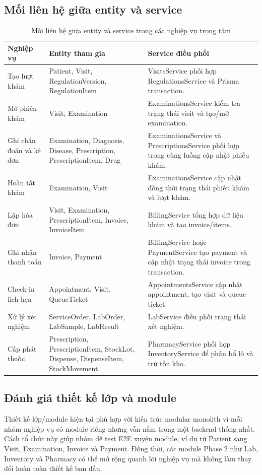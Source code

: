\subsection{Mối liên hệ giữa entity và service}

\begin{longtable}{|p{4cm}|p{5cm}|p{5.5cm}|}
\caption{Mối liên hệ giữa entity và service trong các nghiệp vụ trọng tâm}\\
\hline
\textbf{Nghiệp vụ} & \textbf{Entity tham gia} & \textbf{Service điều phối} \\
\hline
Tạo lượt khám & Patient, Visit, RegulationVersion, RegulationItem & VisitsService phối hợp RegulationsService và Prisma transaction. \\
\hline
Mở phiên khám & Visit, Examination & ExaminationsService kiểm tra trạng thái visit và tạo/mở examination. \\
\hline
Ghi chẩn đoán và kê đơn & Examination, Diagnosis, Disease, Prescription, PrescriptionItem, Drug & ExaminationsService và PrescriptionsService phối hợp trong cùng luồng cập nhật phiếu khám. \\
\hline
Hoàn tất khám & Examination, Visit & ExaminationsService cập nhật đồng thời trạng thái phiếu khám và lượt khám. \\
\hline
Lập hóa đơn & Visit, Examination, PrescriptionItem, Invoice, InvoiceItem & BillingService tổng hợp dữ liệu khám và tạo invoice/items. \\
\hline
Ghi nhận thanh toán & Invoice, Payment & BillingService hoặc PaymentService tạo payment và cập nhật trạng thái invoice trong transaction. \\
\hline
Check-in lịch hẹn & Appointment, Visit, QueueTicket & AppointmentsService cập nhật appointment, tạo visit và queue ticket. \\
\hline
Xử lý xét nghiệm & ServiceOrder, LabOrder, LabSample, LabResult & LabService điều phối trạng thái xét nghiệm. \\
\hline
Cấp phát thuốc & Prescription, PrescriptionItem, StockLot, Dispense, DispenseItem, StockMovement & PharmacyService phối hợp InventoryService để phân bổ lô và trừ tồn kho. \\
\hline
\end{longtable}

\subsection{Đánh giá thiết kế lớp và module}

Thiết kế lớp/module hiện tại phù hợp với kiến trúc modular monolith vì mỗi nhóm nghiệp vụ có module riêng nhưng vẫn nằm trong một backend thống nhất. Cách tổ chức này giúp nhóm dễ test E2E xuyên module, ví dụ từ Patient sang Visit, Examination, Invoice và Payment. Đồng thời, các module Phase 2 như Lab, Inventory và Pharmacy có thể mở rộng quanh lõi nghiệp vụ mà không làm thay đổi hoàn toàn thiết kế ban đầu.


